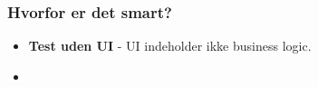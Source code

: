 \subsubsection{Hvorfor er det smart?}

\begin{itemize}
	\item \textbf{Test uden UI} - UI indeholder ikke business logic.
	\item 
\end{itemize}




